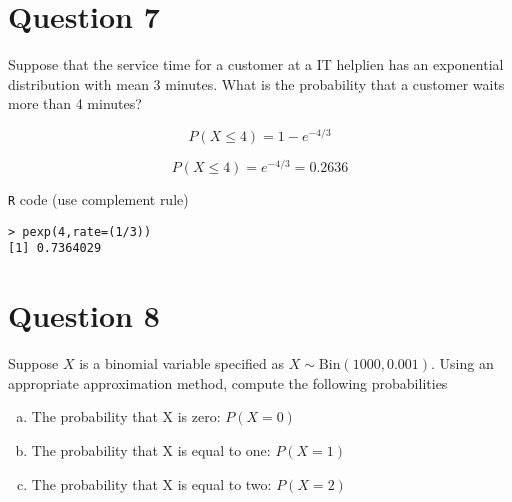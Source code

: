 \documentclass[]{article}
\begin{document}
\section*{Question 7}
Suppose that the service time for a customer at a IT helplien
has an exponential distribution with mean 3 minutes. What is the probability that a
customer waits more than 4 minutes?

\[ P(X  \leq 4) = 1 -  e^{-4/3} \]

\[ P(X  \leq 4) = e^{-4/3} = 0.2636 \]

\begin{framed}
\texttt{R} code (use complement rule)
\begin{verbatim}
> pexp(4,rate=(1/3))
[1] 0.7364029
\end{verbatim}
\end{framed}

\section*{Question 8}
Suppose $X$ is a binomial variable specified as $X \sim \mbox{Bin}(1000,0.001)$. Using an appropriate approximation method, compute the following probabilities
\begin{enumerate}[(a)]
    \item The probability that X is zero: $P(X=0)$
\item The probability that X is equal to one:  $P(X=1)$
\item The probability that X is equal to two:  $P(X=2)$
\end{enumerate}
\end{document}

